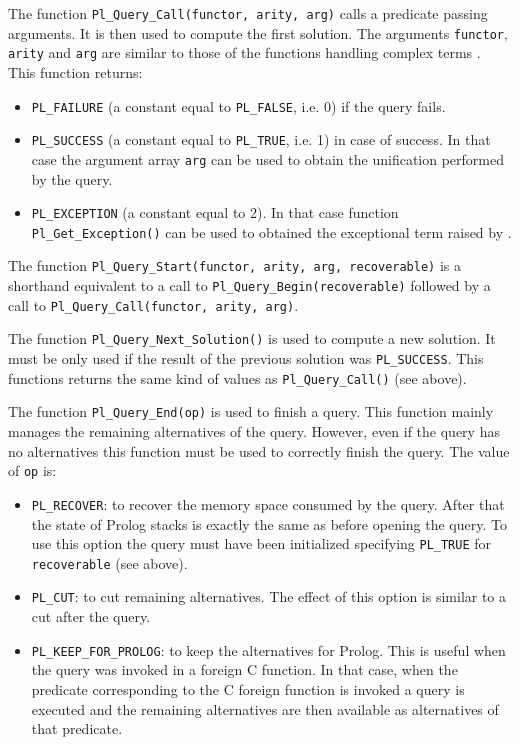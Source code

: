 The function \texttt{Pl\_Query\_Call(functor, arity, arg)} calls a predicate
passing arguments. It is then used to compute the first solution. The
arguments \texttt{functor}, \texttt{arity} and \texttt{arg} are similar to
those of the functions handling complex terms
. This function returns:

\begin{itemize}

\item \texttt{PL\_FAILURE} (a constant equal to \texttt{PL\_FALSE}, i.e. 0) if
the query fails.

\item \texttt{PL\_SUCCESS} (a constant equal to \texttt{PL\_TRUE}, i.e. 1) in
case of success. In that case the argument array \texttt{arg} can be used to
obtain the unification performed by the query.

\item \texttt{PL\_EXCEPTION} (a constant equal to 2). In that case function
\texttt{Pl\_Get\_Exception()} can be used to obtained the exceptional term
raised by  .

\end{itemize}

The function \texttt{Pl\_Query\_Start(functor, arity, arg, recoverable)} is a
shorthand equivalent to a call to \texttt{Pl\_Query\_Begin(recoverable)} followed by
a call to \texttt{Pl\_Query\_Call(functor, arity, arg)}.

The function \texttt{Pl\_Query\_Next\_Solution()} is used to compute a new
solution. It must be only used if the result of the previous solution was
\texttt{PL\_SUCCESS}. This functions returns the same kind of values as
\texttt{Pl\_Query\_Call()} (see above).

The function \texttt{Pl\_Query\_End(op)} is used to finish a query. This
function mainly manages the remaining alternatives of the query. However,
even if the query has no alternatives this function must be used to
correctly finish the query. The value of \texttt{op} is:

\begin{itemize}

\item \texttt{PL\_RECOVER}: to recover the memory space consumed by the
query. After that the state of Prolog stacks is exactly the same as before
opening the query. To use this option the query must have been initialized
specifying \texttt{PL\_TRUE} for \texttt{recoverable} (see above).

\item \texttt{PL\_CUT}: to cut remaining alternatives. The effect of this
option is similar to a cut after the query.

\item \texttt{PL\_KEEP\_FOR\_PROLOG}: to keep the alternatives for Prolog.
This is useful when the query was invoked in a foreign C function. In that
case, when the predicate corresponding to the C foreign function is invoked
a query is executed and the remaining alternatives are then available as
alternatives of that predicate.

\end{itemize}

